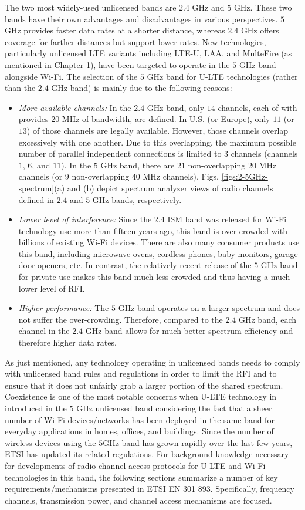 The two most widely-used unlicensed bands are $2.4$ GHz and $5$ GHz. These two bands have their own advantages and disadvantages in various perspectives. $5$ GHz provides faster data rates at a shorter distance, whereas $2.4$ GHz offers coverage for farther distances but support lower rates. New technologies, particularly unlicensed LTE variants including LTE-U, LAA, and MulteFire (as mentioned in Chapter 1), have been targeted to operate in the $5$ GHz band alongside Wi-Fi. The selection of the $5$ GHz band for U-LTE technologies (rather than the $2.4$ GHz band) is mainly due to the following reasons:
\begin{itemize}
\item
\textit{More available channels:} In the $2.4$ GHz band, only $14$ channels, each of with provides $20$ MHz of bandwidth, are defined. In U.S. (or Europe), only $11$ (or $13$) of those channels are legally available. However, those channels overlap excessively with one another. Due to this overlapping, the maximum possible number of parallel independent connections is limited to $3$ channels (channels $1$, $6$, and $11$). In the $5$ GHz band, there are $21$ non-overlapping $20$ MHz channels (or $9$ non-overlapping $40$ MHz channels). Figs. \ref{figs:2-5GHz-spectrum}(a) and (b) depict spectrum analyzer views of radio channels defined in $2.4$ and $5$ GHz bands, respectively.
\item
\textit{Lower level of interference:} Since the $2.4$ ISM band was released for Wi-Fi technology use more than fifteen years ago, this band is over-crowded with billions of existing Wi-Fi devices. There are also many consumer products use this band, including microwave ovens, cordless phones, baby monitors, garage door openers, etc. In contrast, the relatively recent release of the $5$ GHz band for private use makes this band much less crowded and thus having a much lower level of RFI. 
\item
\textit{Higher performance:} The $5$ GHz band operates on a larger spectrum and does not suffer the over-crowding. Therefore, compared to the $2.4$ GHz band, each channel in the $2.4$ GHz band allows for much better spectrum efficiency and therefore higher data rates.
\end{itemize}

As just mentioned, any technology operating in unlicensed bands needs to comply with unlicensed band rules and regulations in order to limit the RFI and to ensure that it does not unfairly grab a larger portion of the shared spectrum.  Coexistence is one of the most notable concerns when U-LTE technology in introduced in the $5$ GHz unlicensed band considering the fact that a sheer number of Wi-Fi devices/networks has been deployed in the same band for everyday applications in homes, offices, and buildings. Since the number of wireless devices using the $5$GHz band has grown rapidly over the last few years, ETSI has updated its related regulations. For background knowledge necessary for developments of radio channel access protocols for U-LTE and Wi-Fi technologies in this band, the following sections summarize a number of key requirements/mechanisms presented in ETSI EN 301 893. Specifically, frequency channels, transmission power, and channel access mechanisms are focused.

